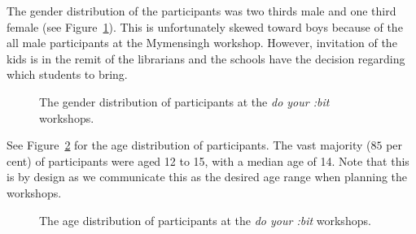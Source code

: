 \documentclass[12pt]{report} %
\newcommand{\DYB}{\textit{do your :bit }}
\begin{document}
The gender distribution of the participants was two thirds male and one third female (see Figure~\ref{fig:DYBgender}). This is unfortunately skewed toward boys because of the all male participants at the Mymensingh workshop. However, invitation of the kids is in the remit of the librarians and the schools have the decision regarding which students to bring.   

\begin{figure}%
\caption{The gender distribution of participants at the \DYB workshops.}
\label{fig:DYBgender}
\end{figure}


See Figure~\ref{fig:DYBage} for the age distribution of participants. The vast majority ($85$ per cent) of participants were aged 12 to 15, with a median age of 14. Note that this is by design as we communicate this as the desired age range when planning the workshops.  

\begin{figure} %
\caption{The age distribution of participants at the \DYB workshops.}
\label{fig:DYBage}
\end{figure}
\end{document}

